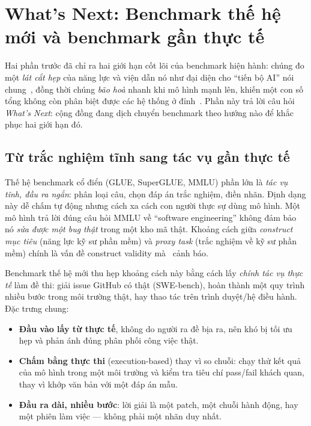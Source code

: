 \section{What's Next: Benchmark thế hệ mới và benchmark gần thực tế}
\label{sec:whats_next}

Hai phần trước đã chỉ ra hai giới hạn cốt lõi của benchmark hiện hành: chúng đo
một \emph{lát cắt hẹp} của năng lực và viện dẫn nó như đại diện cho ``tiến bộ AI''
nói chung~\cite{everything_benchmark}, đồng thời chúng \emph{bão hoà} nhanh khi mô
hình mạnh lên, khiến một con số tổng không còn phân biệt được các hệ thống ở
đỉnh~\cite{superglue}. Phần này trả lời câu hỏi \emph{What's Next}: cộng
đồng đang dịch chuyển benchmark theo hướng nào để khắc phục hai giới hạn đó.

\subsection{Từ trắc nghiệm tĩnh sang tác vụ gần thực tế}

Thế hệ benchmark cổ điển (GLUE, SuperGLUE, MMLU) phần lớn là \emph{tác vụ tĩnh,
đầu ra ngắn}: phân loại câu, chọn đáp án trắc nghiệm, điền nhãn. Định dạng này dễ
chấm tự động nhưng cách xa cách con người thực sự dùng mô hình. Một mô hình trả
lời đúng câu hỏi MMLU về ``software engineering'' không đảm bảo nó \emph{sửa được
một bug thật} trong một kho mã thật. Khoảng cách giữa \emph{construct mục tiêu}
(năng lực kỹ sư phần mềm) và \emph{proxy task} (trắc nghiệm về kỹ sư phần mềm)
chính là vấn đề construct validity mà~\cite{measuring_what_matters} cảnh báo.

Benchmark thế hệ mới thu hẹp khoảng cách này bằng cách lấy \emph{chính tác vụ thực
tế} làm đề thi: giải issue GitHub có thật (SWE-bench), hoàn thành một quy trình
nhiều bước trong môi trường thật, hay thao tác trên trình duyệt/hệ điều hành. Đặc
trưng chung:

\begin{itemize}
  \item \textbf{Đầu vào lấy từ thực tế}, không do người ra đề bịa ra, nên khó bị
    tối ưu hẹp và phản ánh đúng phân phối công việc thật.
  \item \textbf{Chấm bằng thực thi} (execution-based) thay vì so chuỗi: chạy thử
    kết quả của mô hình trong một môi trường và kiểm tra tiêu chí pass/fail khách
    quan, thay vì khớp văn bản với một đáp án mẫu.
  \item \textbf{Đầu ra dài, nhiều bước}: lời giải là một patch, một chuỗi hành
    động, hay một phiên làm việc --- không phải một nhãn duy nhất.
\end{itemize}

